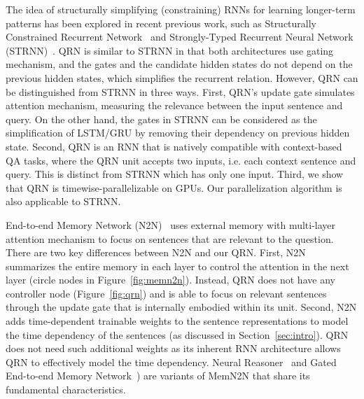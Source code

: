 \documentclass[table]{article}
\begin{document}
The idea of structurally simplifying (constraining) RNNs for learning longer-term patterns has been explored in recent previous work, such as Structurally Constrained Recurrent Network~\citep{scrn} and Strongly-Typed Recurrent Neural Network (STRNN)~\citep{strnn}. 
QRN is similar to STRNN in that both architectures use gating mechanism, and the gates and the candidate hidden states do not depend on the previous hidden states, which simplifies the recurrent relation. 
However, QRN can be distinguished from STRNN in three ways.
First, QRN’s update gate simulates attention mechanism, measuring the relevance between the input sentence and query. On the other hand, the gates in STRNN can be considered as the simplification of LSTM/GRU by removing their dependency on previous hidden state.
Second, QRN is an RNN that is natively compatible with context-based QA tasks, where the QRN unit accepts two inputs, i.e. each context sentence and query. 
This is distinct from STRNN which has only one input. 
Third, we show that QRN is timewise-parallelizable on GPUs. Our parallelization algorithm is also applicable to STRNN.

End-to-end Memory Network (N2N)~\citep{memN2N} uses external memory with multi-layer attention mechanism to focus on sentences that are relevant to the question.
There are two key differences between N2N and our  QRN. 
First, N2N summarizes the entire memory in each layer to control the attention in the next layer (circle nodes in Figure~\ref{fig:memn2n}).
Instead, QRN does not have any controller node (Figure~\ref{fig:qrn}) and is able to focus on relevant sentences through the update gate that is internally embodied within its unit.
Second, N2N adds time-dependent trainable weights to the sentence representations to model the time dependency of the sentences (as discussed in Section~\ref{sec:intro}).
QRN does not need such additional weights as its inherent RNN architecture allows QRN to effectively model the time dependency.
Neural Reasoner~\citep{NR} and Gated End-to-end Memory Network~\citep{perez2016gated}) are variants of MemN2N that share its fundamental characteristics.
\end{document}
